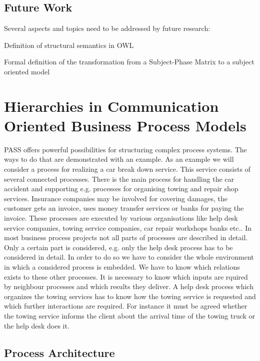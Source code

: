 \subsection{Future Work}
Several aspects and topics need to be addressed by future research:
\begin{list}{-}{spacing}
	\item Definition of structural semantics in OWL
	\item Formal definition of the transformation from a Subject-Phase Matrix to a subject oriented model
\end{list}





\section{Hierarchies in Communication Oriented Business Process Models}

PASS  offers powerful possibilities for structuring complex process systems. The ways to do that are demonstrated with an example.
As an example we will consider a process for realizing a car break down service. This service consists of several connected processes. There is the main process for handling the car accident and supporting e.g. processes for organising towing and repair shop services. Insurance companies may be involved for covering damages, the customer gets an invoice, uses money transfer services or banks for paying the invoice. These processes are executed by various organisations like help desk service companies, towing service companies, car repair workshops banks etc.. In most business process projects not all parts of processes are described in detail. Only a certain part is considered, e.g. only the help desk process has to be considered in detail. In order to do so we have to consider the whole environment in which a considered process is embedded. We have to know which relations exists to these other processes. It is necessary to know which inputs are rquired by neighbour processes and which results they deliver. A help desk process which organizes the towing services has to know how the towing service is requested and which further interactions are required. For instance it must be agreed whether the towing service informs the client about the arrival time of the towing truck or the help desk does it.


\subsection{Process Architecture}

